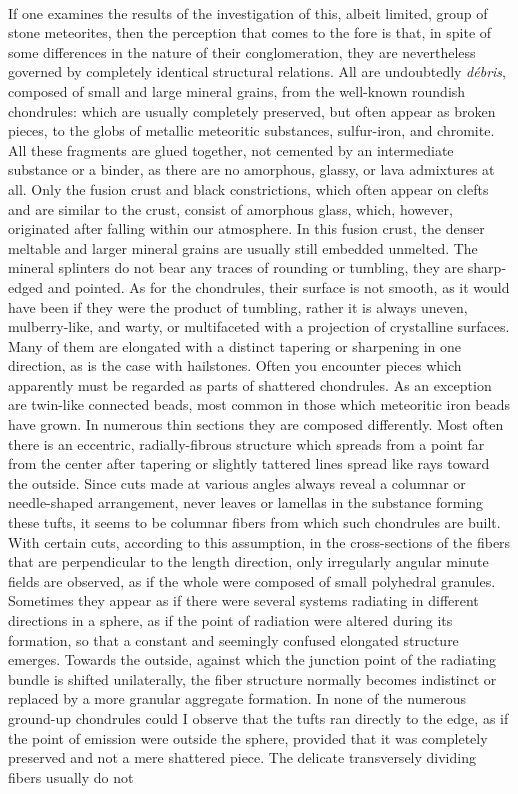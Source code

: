 \documentclass[a4paper, 12pt, oneside]{article}
\begin{document}
\paragraph{}
If one examines the results of the investigation of this, albeit limited, group of stone meteorites, then the perception that comes to the fore is that, in spite of some differences in the nature of their conglomeration, they are nevertheless governed by completely identical structural relations. All are undoubtedly \emph{débris}, composed of small and large mineral grains, from the well-known roundish chondrules: which are usually completely preserved, but often appear as broken pieces, to the globs of metallic meteoritic substances, sulfur-iron, and chromite. All these fragments are glued together, not cemented by an intermediate substance or a binder, as there are no amorphous, glassy, or lava admixtures at all. Only the fusion crust and black constrictions, which often appear on clefts and are similar to the crust, consist of amorphous glass, which, however, originated after falling within our atmosphere. In this fusion crust, the denser meltable and larger mineral grains are usually still embedded unmelted. The mineral splinters do not bear any traces of rounding or tumbling, they are sharp-edged and pointed. As for the chondrules, their surface is not smooth, as it would have been if they were the product of tumbling, rather it is always uneven, mulberry-like, and warty, or multifaceted with a projection of crystalline surfaces. Many of them are elongated with a distinct tapering or sharpening in one direction, as is the case with hailstones. Often you encounter pieces which apparently must be regarded as parts of shattered chondrules. As an exception are twin-like connected beads, most common in those which meteoritic iron beads have grown. In numerous thin sections they are composed differently. Most often there is an eccentric, radially-fibrous structure which spreads from a point far from the center after tapering or slightly tattered lines spread like rays toward the outside. Since cuts made at various angles always reveal a columnar or needle-shaped arrangement, never leaves or lamellas in the substance forming these tufts, it seems to be columnar fibers from which such chondrules are built. With certain cuts, according to this assumption, in the cross-sections of the fibers that are perpendicular to the length direction, only irregularly angular minute fields are observed, as if the whole were composed of small polyhedral granules. Sometimes they appear as if there were several systems radiating in different directions in a sphere, as if the point of radiation were altered during its formation, so that a constant and seemingly confused elongated structure emerges. Towards the outside, against which the junction point of the radiating bundle is shifted unilaterally, the fiber structure normally becomes indistinct or replaced by a more granular aggregate formation. In none of the numerous ground-up chondrules could I observe that the tufts ran directly to the edge, as if the point of emission were outside the sphere, provided that it was completely preserved and not a mere shattered piece. The delicate transversely dividing fibers usually do not 
\end{document}
